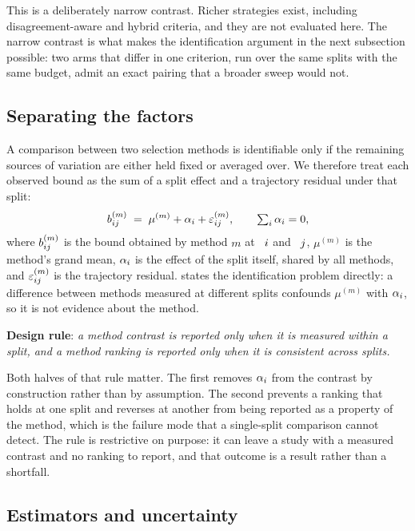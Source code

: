 This is a deliberately narrow contrast. Richer strategies exist, including
disagreement-aware and hybrid criteria, and they are not evaluated here. The
narrow contrast is what makes the identification argument in the next subsection
possible: two arms that differ in one criterion, run over the same splits with
the same budget, admit an exact pairing that a broader sweep would not.

\subsection{Separating the factors}
\label{sec:factors}

A comparison between two selection methods is identifiable only if the remaining
sources of variation are either held fixed or averaged over. We therefore treat
each observed bound as the sum of a split effect and a trajectory residual under
that split:
\begin{equation}\label{eq:decomposition}
  b_{ij}^{(m)}
  \;=\;
  \mu^{(m)} + \alpha_{i} + \varepsilon_{ij}^{(m)},
  \qquad
  \textstyle\sum_{i} \alpha_{i} = 0,
\end{equation}
where $b_{ij}^{(m)}$ is the bound obtained by method $m$ at
\splitseed\ $i$ and \trajseed\ $j$, $\mu^{(m)}$ is the method's
grand mean, $\alpha_{i}$ is the effect of the split itself, shared by all
methods, and $\varepsilon_{ij}^{(m)}$ is the trajectory residual.
 states the identification problem directly: a difference
between methods measured at different splits confounds $\mu^{(m)}$ with
$\alpha_{i}$, so it is not evidence about the method.

\textbf{Design rule}: \textit{a method contrast is reported only when it is
measured within a split, and a method ranking is reported only when it is
consistent across splits.}

Both halves of that rule matter. The first removes $\alpha_{i}$ from the
contrast by construction rather than by assumption. The second prevents a
ranking that holds at one split and reverses at another from being reported as a
property of the method, which is the failure mode that a single-split comparison
cannot detect. The rule is restrictive on purpose: it can leave a study with a
measured contrast and no ranking to report, and that outcome is a result rather
than a shortfall.

\subsection{Estimators and uncertainty}
\label{sec:estimators}

